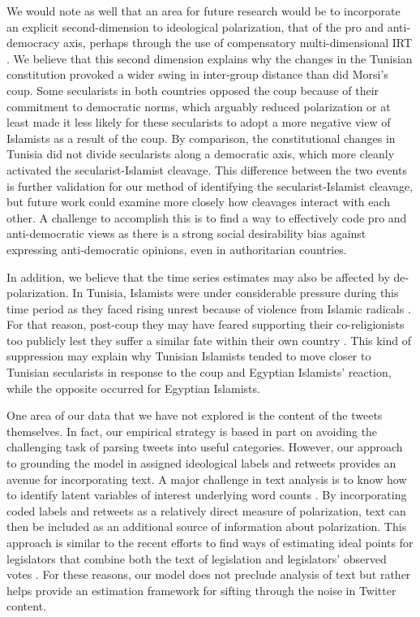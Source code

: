 \documentclass[12pt]{article}
\begin{document}
We would note as well that an area for future research would be to incorporate an explicit second-dimension to ideological polarization, that of the pro and anti-democracy axis, perhaps through the use of compensatory multi-dimensional IRT \parencite{reckase2009}. We believe that this second dimension explains why the changes in the Tunisian constitution provoked a wider swing in inter-group distance than did Morsi's coup. Some secularists in both countries opposed the coup because of their commitment to democratic norms, which arguably reduced polarization or at least made it less likely for these secularists to adopt a more negative view of Islamists as a result of the coup. By comparison, the constitutional changes in Tunisia did not divide secularists along a democratic axis, which more cleanly activated the secularist-Islamist cleavage. This difference between the two events is further validation for our method of identifying the secularist-Islamist cleavage, but future work could examine more closely how cleavages interact with each other. A challenge to accomplish this is to find a way to effectively code pro and anti-democratic views as there is a strong social desirability bias against expressing anti-democratic opinions, even in authoritarian countries.

In addition, we believe that the time series estimates may also be affected by de-polarization. In Tunisia, Islamists were under considerable pressure during this time period as they faced rising unrest because of violence from Islamic radicals \parencite{mccarthy2016}. For that reason, post-coup they may have feared supporting their co-religionists too publicly lest they suffer a similar fate within their own country \parencite{grewal2016}. This kind of suppression may explain why Tunisian Islamists tended to move closer to Tunisian secularists in response to the coup and Egyptian Islamists' reaction, while the opposite occurred for Egyptian Islamists. 

One area of our data that we have not explored is the content of the tweets themselves. In fact, our empirical strategy is based in part on avoiding the challenging task of parsing tweets into useful categories. However, our approach to grounding the model in assigned ideological labels and retweets provides an avenue for incorporating text. A major challenge in text analysis is to know how to identify latent variables of interest underlying word counts \parencite{slapin2008,grimmer2013}. By incorporating coded labels and retweets as a relatively direct measure of polarization, text can then be included as an additional source of information about polarization. This approach is similar to the recent efforts to find ways of estimating ideal points for legislators that combine both the text of legislation and legislators' observed votes \parencite{lauderdale2014}. For these reasons, our model does not preclude analysis of text but rather helps provide an estimation framework for sifting through the noise in Twitter content.
\end{document}
